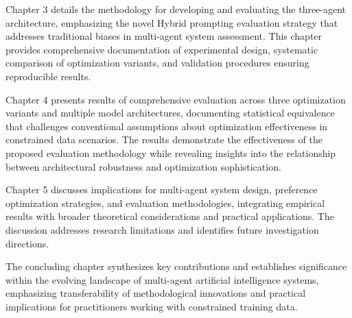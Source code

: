 Chapter 3 details the methodology for developing and evaluating the three-agent architecture, emphasizing the novel Hybrid prompting evaluation strategy that addresses traditional biases in multi-agent system assessment. This chapter provides comprehensive documentation of experimental design, systematic comparison of optimization variants, and validation procedures ensuring reproducible results.

Chapter 4 presents results of comprehensive evaluation across three optimization variants and multiple model architectures, documenting statistical equivalence that challenges conventional assumptions about optimization effectiveness in constrained data scenarios. The results demonstrate the effectiveness of the proposed evaluation methodology while revealing insights into the relationship between architectural robustness and optimization sophistication.

Chapter 5 discusses implications for multi-agent system design, preference optimization strategies, and evaluation methodologies, integrating empirical results with broader theoretical considerations and practical applications. The discussion addresses research limitations and identifies future investigation directions.

The concluding chapter synthesizes key contributions and establishes significance within the evolving landscape of multi-agent artificial intelligence systems, emphasizing transferability of methodological innovations and practical implications for practitioners working with constrained training data.
